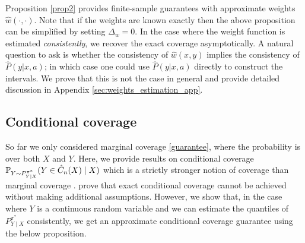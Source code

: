 Proposition \ref{prop2} provides finite-sample guarantees with approximate weights $\hat{w}(\cdot, \cdot)$. Note that if the weights are known exactly then the above proposition can be simplified by setting $\Delta_w =0$. In the case where the weight function is estimated \textit{consistently}, we recover the exact coverage asymptotically. A natural question to ask is whether the consistency of $\hat{w}(x, y)$ implies the consistency of $\hat{P}(y|x, a)$; in which case one could use $\hat{P}(y|x, a)$ directly to construct the intervals. We prove that this is not the case in general and provide detailed discussion in Appendix \ref{sec:weights_estimation_app}. 

\subsection{Conditional coverage}\label{sec:cond_cov}
So far we only considered marginal coverage \eqref{guarantee}, where the probability is over both $X$ and $Y$. Here, we provide results on conditional coverage $\mathbb{P}_{Y \sim P^{\pi^*}_{Y \mid X}}(Y \in \hat{C}_n(X) \mid X)$ which is a strictly stronger notion of coverage than marginal coverage \citep{foygel2021limits}. \cite{vovk2012, lei2014distribution} prove that exact conditional coverage cannot be achieved without making additional assumptions. However, we show that, in the case where $Y$ is a continuous random variable and we can estimate the quantiles of $P^{\pi^*}_{Y \mid X}$ consistently, we get an approximate conditional coverage guarantee using the below proposition.
